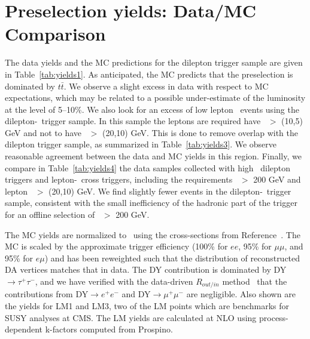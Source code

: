 \section{Preselection yields: Data/MC Comparison}
\label{sec:yields}

The data yields and the MC predictions for the dilepton trigger sample are given in Table~\ref{tab:yields1}. 
As anticipated, the MC predicts that the preselection is dominated by $t\bar{t}$.  
We observe a slight excess in data with respect to MC expectations, which may be
related to a possible under-estimate of the luminosity at the level of 5--10\%.
We also look for an excess of low lepton \pt\ events using the dilepton-\Ht\ trigger sample.
In this sample the leptons are required have \pt\ $>$ (10,5) GeV and not to have \pt\ $>$ (20,10) GeV.
This is done to remove overlap with the dilepton trigger sample, as summarized in Table~\ref{tab:yields3}. 
We observe reasonable agreement between the data and MC yields in this region.
Finally, we compare in Table~\ref{tab:yields4} the data samples collected with high \pt\ dilepton
triggers and lepton-\Ht\ cross triggers, including the requirements
\Ht\ $>$ 200 GeV and lepton \pt\ $>$ (20,10) GeV. We find slightly fewer events in the dilepton-\Ht\ trigger sample, consistent with the small inefficiency of the hadronic part of the trigger for an offline selection of \Ht\ $>$ 200 GeV.

The MC yields are normalized to \lumi\ using the cross-sections
from Reference~\cite{ref:xsec}. 
The MC is scaled by the approximate trigger efficiency (100\% for $ee$,
95\% for $\mu\mu$, and 95\% for $e\mu$) and has been reweighted such that the distribution of 
reconstructed DA vertices matches that in data. 
The DY contribution is dominated by DY$\rightarrow \tau^+\tau^-$,
and we have verified with the data-driven $R_{out/in}$ method~\cite{ref:top} that the
contributions from DY$\to e^{+}e^{-}$ and DY$\to \mu^{+}\mu^{-}$ are negligible.
Also shown are the yields for LM1 and LM3, two of the LM 
points which are benchmarks for SUSY analyses at CMS. The LM yields
are calculated at NLO using process-dependent k-factors computed from Prospino.


